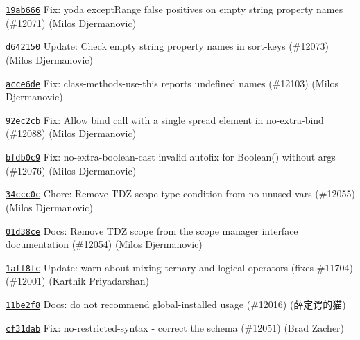 \begin{DoxyItemize}
\item \href{https://github.com/eslint/eslint/commit/19ab6666e8e4142a183bdee2be96e5bafbac0e21}{\texttt{ {\ttfamily 19ab666}}} Fix\+: yoda except\+Range false positives on empty string property names (\#12071) (Milos Djermanovic)
\item \href{https://github.com/eslint/eslint/commit/d642150fe016608e71a1df2a72960e915b3cfbad}{\texttt{ {\ttfamily d642150}}} Update\+: Check empty string property names in sort-\/keys (\#12073) (Milos Djermanovic)
\item \href{https://github.com/eslint/eslint/commit/acce6de940e2b089ff5ba59e4518a54af1682d5e}{\texttt{ {\ttfamily acce6de}}} Fix\+: class-\/methods-\/use-\/this reports \textquotesingle{}undefined\textquotesingle{} names (\#12103) (Milos Djermanovic)
\item \href{https://github.com/eslint/eslint/commit/92ec2cb1731b7b6e0ac66336d583fbb782504290}{\texttt{ {\ttfamily 92ec2cb}}} Fix\+: Allow bind call with a single spread element in no-\/extra-\/bind (\#12088) (Milos Djermanovic)
\item \href{https://github.com/eslint/eslint/commit/bfdb0c97003fc0e045aa6ed10b177c35305a6e46}{\texttt{ {\ttfamily bfdb0c9}}} Fix\+: no-\/extra-\/boolean-\/cast invalid autofix for Boolean() without args (\#12076) (Milos Djermanovic)
\item \href{https://github.com/eslint/eslint/commit/34ccc0cd81f495190e585c6efa8ae233d45bd3ed}{\texttt{ {\ttfamily 34ccc0c}}} Chore\+: Remove T\+DZ scope type condition from no-\/unused-\/vars (\#12055) (Milos Djermanovic)
\item \href{https://github.com/eslint/eslint/commit/01d38ce2faf0abbc9dd5d25694baeee131036165}{\texttt{ {\ttfamily 01d38ce}}} Docs\+: Remove T\+DZ scope from the scope manager interface documentation (\#12054) (Milos Djermanovic)
\item \href{https://github.com/eslint/eslint/commit/1aff8fc4f9394cd9126654a55f7f3a43ab1cf8f0}{\texttt{ {\ttfamily 1aff8fc}}} Update\+: warn about mixing ternary and logical operators (fixes \#11704) (\#12001) (Karthik Priyadarshan)
\item \href{https://github.com/eslint/eslint/commit/11be2f8513bd61499f6247392a33ac0a26901c90}{\texttt{ {\ttfamily 11be2f8}}} Docs\+: do not recommend global-\/installed usage (\#12016) (薛定谔的猫)
\item \href{https://github.com/eslint/eslint/commit/cf31dab5d5982151e0cfcc32879e69a83180ec70}{\texttt{ {\ttfamily cf31dab}}} Fix\+: no-\/restricted-\/syntax -\/ correct the schema (\#12051) (Brad Zacher)

\end{DoxyItemize}
